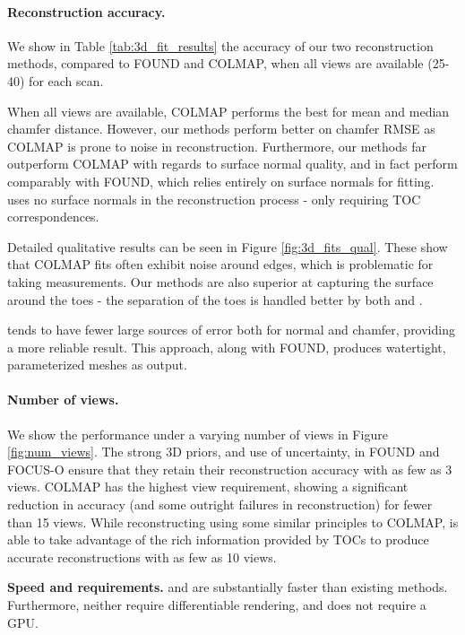 
\paragraph{Reconstruction accuracy. } We show in Table \ref{tab:3d_fit_results} the accuracy of our two reconstruction methods, compared to FOUND and COLMAP, when all views are available (25-40) for each scan.

When all views are available, COLMAP performs the best for mean and median chamfer distance. However, our methods perform better on chamfer RMSE as COLMAP is prone to noise in reconstruction. Furthermore, our methods far outperform COLMAP with regards to surface normal quality, and in fact perform comparably with FOUND, which relies entirely on surface normals for fitting. \ourOptim uses no surface normals in the reconstruction process - only requiring TOC correspondences.

Detailed qualitative results can be seen in Figure \ref{fig:3d_fits_qual}. These show that COLMAP fits often exhibit noise around edges, which is problematic for taking measurements. Our methods are also superior at capturing the surface around the toes - the separation of the toes is handled better by both \ourSfM and \ourOptim.

\ourOptim tends to have fewer large sources of error both for normal and chamfer, providing a more reliable result. This approach, along with FOUND, produces watertight, parameterized meshes as output.

\paragraph{Number of views. } We show the performance under a varying number of views in Figure 
\ref{fig:num_views}. The strong 3D priors, and use of uncertainty, in FOUND and FOCUS-O ensure that they retain their reconstruction accuracy with as few as 3 views.
COLMAP has the highest view requirement, showing a significant reduction in accuracy (and some outright failures in reconstruction) for fewer than 15 views. While reconstructing using some similar principles to COLMAP, \ourSfM is able to take advantage of the rich information provided by TOCs to produce accurate reconstructions with as few as 10 views.

\begin{table}
    \centering
    \begingroup
    \small
    
    \endgroup
    \caption{\textbf{Speed and requirements.} \ourOptim and \ourSfM are substantially faster than existing methods. Furthermore, neither require differentiable rendering, and \ourSfM does not require a GPU.}
    \label{tab:speed_and_requirements}
\end{table}


